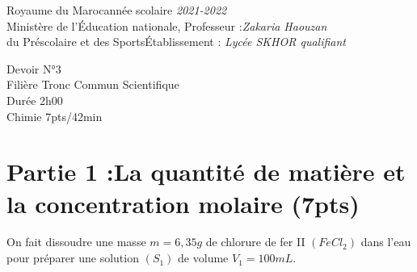 \documentclass[12pt]{article}
\newcommand\headerMe[2]{\noindent{}#1\hfill#2}
\begin{document}
\headerMe{Royaume du Maroc}{année scolaire \emph{2021-2022}}\\
\headerMe{Ministère de l'Éducation nationale, }{  Professeur :\emph{Zakaria Haouzan}}\\
\headerMe{du Préscolaire et des Sports}{Établissement : \emph{Lycée SKHOR qualifiant}}\\

\begin{center}
Devoir  N°3 \\
   Filière Tronc Commun Scientifique\\
Durée 2h00
\\
    \vspace{.2cm}
\hrulefill
\Large{Chimie 7pts/42min}
\hrulefill\\

\end{center}
 \section*{Partie 1 :La quantité de matière et la concentration molaire \dotfill (7pts) }
On fait dissoudre une masse $m = 6,35 g$ de chlorure de fer II $(FeCl_2)$ dans l’eau pour préparer une solution $(S_1)$ de volume $V_1 = 100 mL$.
\end{document}
